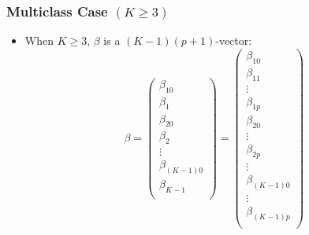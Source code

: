 \documentclass[12pt,notes,mathserif]{beamer}
\begin{document}
\begin{frame}[c]
	\frametitle{Multiclass Case $(K\geqslant{} 3)$}
	\begin{itemize}
		\item When $K \geqslant{} 3$, $\beta$ is a $(K-1)(p+1)$-vector:
		      \begin{equation*}
			      \beta=
			      \begin{pmatrix}
				      \beta_{10}     \\
				      \beta_{1}      \\
				      \beta_{20}     \\
				      \beta_{2}      \\
				      \vdots         \\
				      \beta_{(K-1)0} \\
				      \beta_{K-1}    \\
			      \end{pmatrix}=
			      \begin{pmatrix}
				      \beta_{10}     \\
				      \beta_{11}     \\
				      \vdots         \\
				      \beta_{1p}     \\
				      \beta_{20}     \\
				      \vdots         \\
				      \beta_{2p}     \\
				      \vdots         \\
				      \beta_{(K-1)0} \\
				      \vdots         \\
				      \beta_{(K-1)p} \\
			      \end{pmatrix}
		      \end{equation*}
	\end{itemize}

\end{frame}
\end{document}
